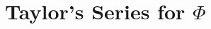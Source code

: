 \documentclass{article}
\newcommand{\abs}[1]{\left| #1 \right|}
\DeclareMathOperator{\sinc}{sinc}
\begin{document}

\section{Taylor's Series for $\Phi$}
\end{document}
